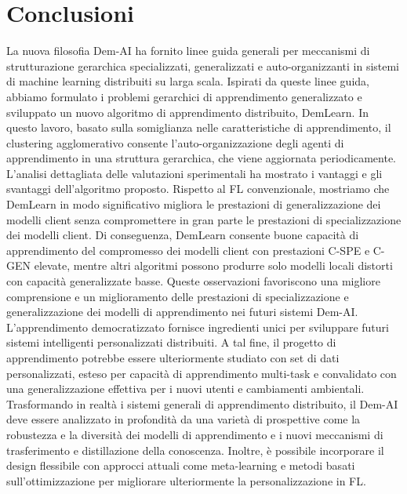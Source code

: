 \chapter{Conclusioni}\label{ch:conclusioni}
La nuova filosofia Dem-AI ha fornito linee guida generali per meccanismi di strutturazione gerarchica specializzati, generalizzati e auto-organizzanti in sistemi di machine learning distribuiti su larga scala. Ispirati da queste linee guida, abbiamo formulato i problemi gerarchici di apprendimento generalizzato e sviluppato un nuovo algoritmo di apprendimento distribuito, DemLearn. In questo lavoro, basato sulla somiglianza nelle caratteristiche di apprendimento, il clustering agglomerativo consente l'auto-organizzazione degli agenti di apprendimento in una struttura gerarchica, che viene aggiornata periodicamente. L'analisi dettagliata delle valutazioni sperimentali ha mostrato i vantaggi e gli svantaggi dell'algoritmo proposto. Rispetto al FL convenzionale, mostriamo che DemLearn in modo significativo migliora le prestazioni di generalizzazione dei modelli client senza compromettere in gran parte le prestazioni di specializzazione dei modelli client. Di conseguenza, DemLearn consente buone capacità di apprendimento del compromesso dei modelli client con prestazioni C-SPE e C-GEN elevate, mentre altri algoritmi possono produrre solo modelli locali distorti con capacità generalizzate basse. Queste osservazioni favoriscono una migliore comprensione e un miglioramento delle prestazioni di specializzazione e generalizzazione dei modelli di apprendimento nei futuri sistemi Dem-AI. L'apprendimento democratizzato fornisce ingredienti unici per sviluppare futuri sistemi intelligenti personalizzati distribuiti.
A tal fine, il progetto di apprendimento potrebbe essere ulteriormente studiato con set di dati personalizzati, esteso per capacità di apprendimento multi-task e convalidato con una generalizzazione effettiva per i nuovi utenti e cambiamenti ambientali. Trasformando in realtà i sistemi generali di apprendimento distribuito, il Dem-AI deve essere analizzato in profondità da una varietà di prospettive come la robustezza e la diversità dei modelli di apprendimento e i nuovi meccanismi di trasferimento e distillazione della conoscenza. Inoltre, è possibile incorporare il design flessibile con approcci attuali come meta-learning e metodi basati sull'ottimizzazione per migliorare ulteriormente la personalizzazione in FL.